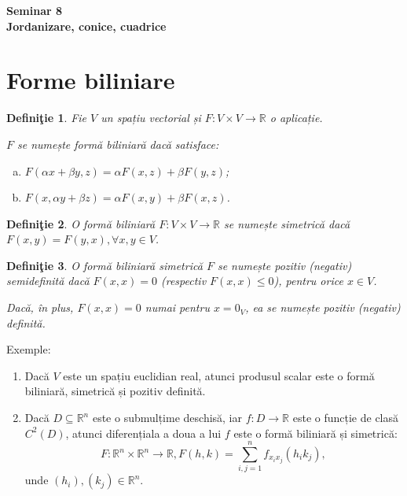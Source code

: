 \documentclass[11pt,a4paper]{article}
\newcommand\seq{\subseteq}
\newcommand\RR{\mathbb{R}}
\theoremstyle{dotless}
\theoremstyle{dotlessdr}
\newtheorem{definition}{Defini\c{t}ie}[section]
\begin{document}
\begin{center}
  {\large\textbf{Seminar 8 \\
    Jordanizare, conice, cuadrice}}
\end{center}

\tableofcontents

\newpage

\section{Forme biliniare}
\label{sec:biliniare}

\begin{definition}\label{def:forma-bil}
  Fie $V$ un spațiu vectorial și $F : V \times V \to \RR$ o aplicație.

  $F$ se numește \emph{formă biliniară} dacă satisface:
  \begin{enumerate}[(a)]
  \item $F(\alpha x + \beta y, z) = \alpha F(x, z) + \beta F(y, z)$;
  \item $F(x, \alpha y + \beta z) = \alpha F(x, y) + \beta F(x, z)$.
  \end{enumerate}
\end{definition}

\begin{definition}\label{def:bil-sim}
  O formă biliniară $F : V \times V \to \RR$ se numește \emph{simetrică} dacă
  $F(x, y) = F(y, x), \forall x, y \in V$.
\end{definition}


\begin{definition}\label{def:bil-neg-def}
  O formă biliniară simetrică $F$ se numește \emph{pozitiv (negativ) semidefinită}
  dacă $F(x, x) = 0$ (respectiv $F(x, x) \leq 0$), pentru orice $x \in V$.

  Dacă, în plus, $F(x, x) = 0$ numai pentru $x = 0_V$, ea se numește \emph{pozitiv %
  (negativ) definită}.
\end{definition}

Exemple:
\begin{enumerate}[(1)]
\item Dacă $V$ este un spațiu euclidian real, atunci produsul scalar este o formă
  biliniară, simetrică și pozitiv definită.
\item Dacă $D \seq \RR^n$ este o submulțime deschisă, iar $f : D \to \RR$ este o
  funcție de clasă $C^2(D)$, atunci diferențiala a doua a lui $f$ este o formă
  biliniară și simetrică:
  \[
    F : \RR^n \times \RR^n \to \RR, F(h, k) = \sum_{i, j = 1}^n f_{x_i x_j}(h_i k_j),
  \]
  unde $(h_i), (k_j) \in \RR^n$.
\end{enumerate}
\end{document}
